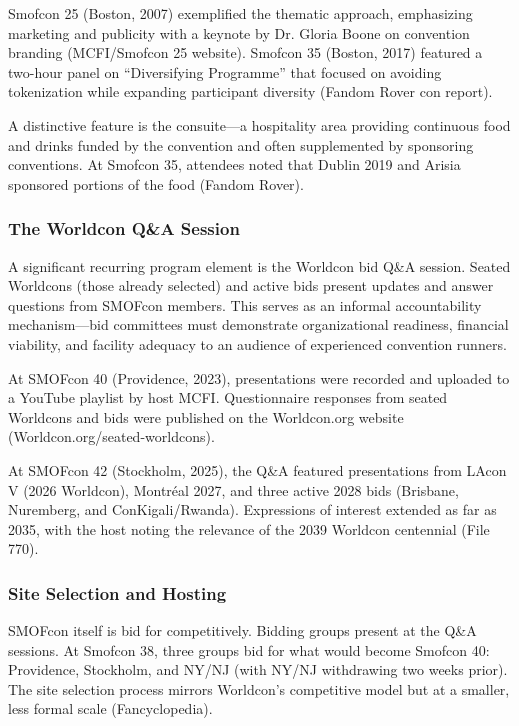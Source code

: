 \documentclass[11pt,letterpaper]{article}
\begin{document}
Smofcon 25 (Boston, 2007) exemplified the thematic approach, emphasizing marketing and publicity with a keynote by Dr. Gloria Boone on convention branding (MCFI/Smofcon 25 website). Smofcon 35 (Boston, 2017) featured a two-hour panel on ``Diversifying Programme'' that focused on avoiding tokenization while expanding participant diversity (Fandom Rover con report).

A distinctive feature is the consuite---a hospitality area providing continuous food and drinks funded by the convention and often supplemented by sponsoring conventions. At Smofcon 35, attendees noted that Dublin 2019 and Arisia sponsored portions of the food (Fandom Rover).

\subsubsection{The Worldcon Q\&A Session}

A significant recurring program element is the Worldcon bid Q\&A session. Seated Worldcons (those already selected) and active bids present updates and answer questions from SMOFcon members. This serves as an informal accountability mechanism---bid committees must demonstrate organizational readiness, financial viability, and facility adequacy to an audience of experienced convention runners.

At SMOFcon 40 (Providence, 2023), presentations were recorded and uploaded to a YouTube playlist by host MCFI. Questionnaire responses from seated Worldcons and bids were published on the Worldcon.org website (Worldcon.org/seated-worldcons).

At SMOFcon 42 (Stockholm, 2025), the Q\&A featured presentations from LAcon V (2026 Worldcon), Montr\'{e}al 2027, and three active 2028 bids (Brisbane, Nuremberg, and ConKigali/Rwanda). Expressions of interest extended as far as 2035, with the host noting the relevance of the 2039 Worldcon centennial (File 770).

\subsubsection{Site Selection and Hosting}

SMOFcon itself is bid for competitively. Bidding groups present at the Q\&A sessions. At Smofcon 38, three groups bid for what would become Smofcon 40: Providence, Stockholm, and NY/NJ (with NY/NJ withdrawing two weeks prior). The site selection process mirrors Worldcon's competitive model but at a smaller, less formal scale (Fancyclopedia).
\end{document}
